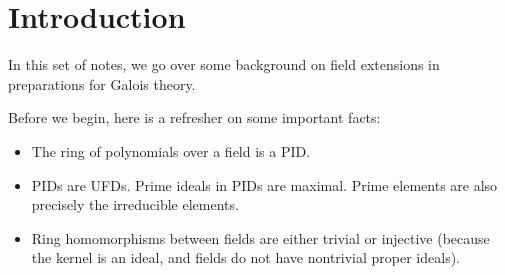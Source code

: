 \section{Introduction}
In this set of notes, we go over some background on field extensions in preparations for Galois theory.

Before we begin, here is a refresher on some important facts:
\begin{itemize}
    \item The ring of polynomials over a field is a PID.
    \item PIDs are UFDs. Prime ideals in PIDs are maximal. Prime elements are also precisely the irreducible elements.
    \item Ring homomorphisms between fields are either trivial or injective (because the kernel is an ideal, and fields do not have nontrivial proper ideals).
\end{itemize}
